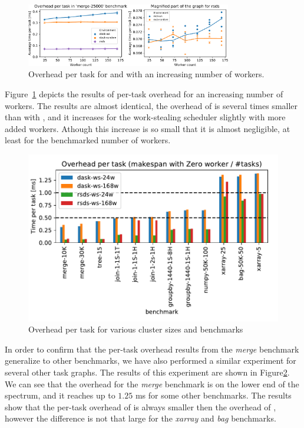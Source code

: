 \begin{figure}
	\centering
	\includegraphics[width=0.8\textwidth]{./imgs/rsds/charts/rsds-merge-worker-scaling}
	\caption{Overhead per task for \rsds{} and \dask{} with an
	increasing number of workers.}
	\label{fig:rsds-merge-worker-scaling}
\end{figure}

Figure~\ref{fig:rsds-merge-worker-scaling} depicts the results of per-task overhead for an increasing
number of workers. The results are almost identical, the overhead of \rsds{} is
several times smaller than with \dask{}, and it increases for the work-stealing
scheduler slightly with more added workers. Athough this increase is so small that it is almost
negligible, at least for the benchmarked number of workers.

\begin{figure}
	\centering
	\includegraphics[width=0.8\columnwidth]{./imgs/rsds/charts/rsds-dask-overhead-all}
	\caption{Overhead per task for various cluster sizes and benchmarks}
	\label{fig:rsds-dask-overhead-all}
\end{figure}

In order to confirm that the per-task overhead results from the \emph{merge}
benchmark generalize to other benchmarks, we have also performed a similar experiment for several
other task graphs. The results of this experiment are shown in Figure\ref{fig:rsds-dask-overhead-all}.
We can see that the overhead for the \emph{merge} benchmark is on the lower end of
the spectrum, and it reaches up to $1.25$ ms for some other benchmarks. The
results show that the per-task overhead of \rsds{} is always smaller then the
overhead of \dask{}, however the difference is not that large for the
\emph{xarray} and \emph{bag} benchmarks.

